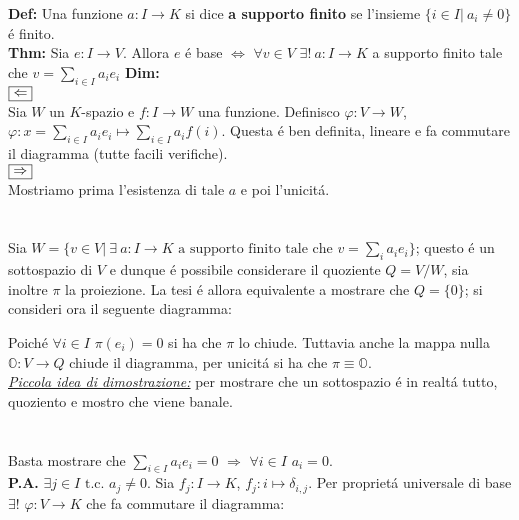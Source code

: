 \documentclass[a4paper,11pt]{article}
\newcommand{\tc}{\mbox{ t.c. }}
\newcommand{\nullspace}{\{0\}}
\newcommand{\function}[3]{#1:#2 \rightarrow #3}
\newcommand{\thm}{\vskip 0.05cm \noindent \textbf{Thm:} }
\newcommand{\proof}{\vskip 0.05cm \noindent \textbf{Dim:} }
\newcommand{\definition}{\vskip 0.05cm \noindent \textbf{Def:} }
\newcommand{\vlad}{\underline{\it Piccola idea di dimostrazione:} }
\newcommand{\frdasx}{ \framebox[\width]{ $\Rightarrow$ } }
\newcommand{\frdadx}{ \framebox[\width]{ $\Leftarrow$ } }
\newcommand{\existence}{\framebox[\width]{ $\exists$ }}
\newcommand{\uniqueness}{\framebox[\width]{ ! }}
\newcommand{\sse}{\Leftrightarrow}
\begin{document}
\definition Una funzione $\function{a}{I}{K}$ si dice {\bf a supporto finito} se l'insieme $\{i\in I |\ a_{i} \neq 0\}$ \'e finito.\\

\thm Sia $\function{e}{I}{V}$. Allora $e$ \'e base $\sse$ $\forall v\in V$ $\exists !\ \function{a}{I}{K}$ a supporto finito tale che $v=\sum_{i\in I}a_{i}e_{i}$
\proof \\ $\frdadx$\\
Sia $W$ un $K$-spazio e $\function{f}{I}{W}$ una funzione. Definisco $\function{\varphi}{V}{W}$,
$\varphi:x=\sum_{i\in I}a_{i}e_{i} \mapsto \sum_{i\in I}a_{i}f(i)$. Questa \'e ben definita, lineare e fa commutare il diagramma (tutte facili verifiche).\\
$\frdasx$\\
Mostriamo prima l'esistenza di tale $a$ e poi l'unicit\'a.\\
\\
\existence\\
Sia $W=\{v \in V |\ \exists \ \function{a}{I}{K} \mbox{ a supporto finito tale che } v=\sum_{i} a_{i}e_{i}\}$; questo \'e un sottospazio di $V$ e dunque \'e possibile considerare il quoziente $Q=V/W$, sia inoltre $\pi$ la proiezione. La tesi \'e allora equivalente a mostrare che $Q=\nullspace$; si consideri ora il seguente diagramma:
\begin{center}
\end{center}
Poich\'e $\forall i \in I$ $\pi(e_{i})=0$ si ha che $\pi$ lo chiude. Tuttavia anche la mappa nulla $\function{\mathbb{O}}{V}{Q}$ chiude il diagramma, per unicit\'a si ha che $\pi \equiv \mathbb{O}$.\\
\vlad per mostrare che un sottospazio \'e in realt\'a tutto, quoziento e mostro che viene banale.\\
\\
\uniqueness\\
Basta mostrare che $\sum_{i\in I}a_{i}e_{i}=0$ $\Rightarrow$ $\forall i\in I$ $a_{i}=0$.\\
{\bf P.A.} $\exists j\in I \tc a_{j}\neq0$. Sia $\function{f_{j}}{I}{K}$, $f_{j}:i\mapsto \delta_{i,j}$. Per propriet\'a universale di base $\exists !$ $\function{\varphi}{V}{K}$ che fa commutare il diagramma:
\end{document}
